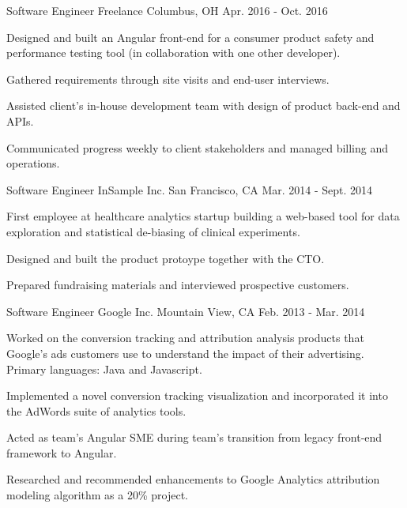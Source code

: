 \begin{cventries}
  \cventry
    {Software Engineer} %
    {Freelance} %
    {Columbus, OH} %
    {Apr. 2016 - Oct. 2016} %
    {
      \begin{cvitems} %
        \item {Designed and built an Angular front-end for a consumer product safety and performance testing tool (in collaboration with one other developer).}
        \item {Gathered requirements through site visits and end-user interviews.}
        \item {Assisted client's in-house development team with design of product back-end and APIs.}
        \item {Communicated progress weekly to client stakeholders and managed billing and operations.}
      \end{cvitems}
    }

  \cventry
    {Software Engineer} %
    {InSample Inc.} %
    {San Francisco, CA} %
    {Mar. 2014 - Sept. 2014} %
    {
      \begin{cvitems} %
        \item {First employee at healthcare analytics startup building a web-based tool for data exploration and statistical de-biasing of clinical experiments.}
        \item {Designed and built the product protoype together with the CTO.}
        \item {Prepared fundraising materials and interviewed prospective customers.}
      \end{cvitems}
    }

  \cventry
    {Software Engineer} %
    {Google Inc.} %
    {Mountain View, CA} %
    {Feb. 2013 - Mar. 2014} %
    {
      \begin{cvitems} %
        \item {Worked on the conversion tracking and attribution analysis products that Google’s ads customers use to understand the impact of their advertising. Primary languages: Java and Javascript.}
        \item {Implemented a novel conversion tracking visualization and incorporated it into the AdWords suite of analytics tools.}
        \item {Acted as team's Angular SME during team's transition from legacy front-end framework to Angular.}
        \item {Researched and recommended enhancements to Google Analytics attribution modeling algorithm as a 20\% project.}
      \end{cvitems}
    }


\end{cventries}
